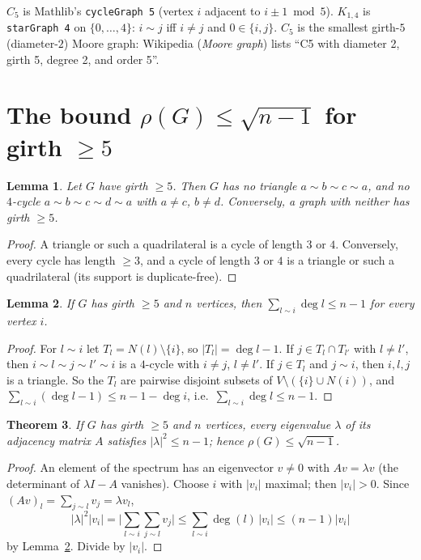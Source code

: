 \documentclass[11pt]{article}
\newtheorem{theorem}{Theorem}
\newtheorem{lemma}[theorem]{Lemma}
\theoremstyle{definition}
\theoremstyle{remark}
\renewcommand{\_}{\oldus\allowbreak}
\begin{document}
\noindent $C_5$ is Mathlib's \texttt{cycleGraph 5} (vertex $i$ adjacent to $i\pm1 \bmod 5$). $K_{1,4}$ is
\texttt{starGraph 4} on $\{0,\dots,4\}$: $i\sim j$ iff $i\ne j$ and $0\in\{i,j\}$. $C_5$ is the smallest
girth-$5$ (diameter-$2$) Moore graph: Wikipedia (\emph{Moore graph}) lists ``C5 with diameter 2, girth 5, degree 2, and order 5''.

\section{The bound $\rho(G)\le\sqrt{n-1}$ for girth $\ge5$}

\begin{lemma}\label{lem:girth}
Let $G$ have girth $\ge5$. Then $G$ has no triangle $a\sim b\sim c\sim a$, and no $4$-cycle
$a\sim b\sim c\sim d\sim a$ with $a\ne c$, $b\ne d$. Conversely, a graph with neither has girth $\ge5$.
\end{lemma}

\begin{proof}
A triangle or such a quadrilateral is a cycle of length $3$ or $4$. Conversely, every cycle has length
$\ge3$, and a cycle of length $3$ or $4$ is a triangle or such a quadrilateral (its support is duplicate-free).
\end{proof}

\begin{lemma}\label{lem:deg}
If $G$ has girth $\ge5$ and $n$ vertices, then $\sum_{l\sim i}\deg l\le n-1$ for every vertex $i$.
\end{lemma}

\begin{proof}
For $l\sim i$ let $T_l=N(l)\setminus\{i\}$, so $|T_l|=\deg l-1$. If $j\in T_l\cap T_{l'}$ with $l\ne l'$, then
$i\sim l\sim j\sim l'\sim i$ is a $4$-cycle with $i\ne j$, $l\ne l'$. If $j\in T_l$ and $j\sim i$, then
$i,l,j$ is a triangle. So the $T_l$ are pairwise disjoint subsets of $V\setminus(\{i\}\cup N(i))$, and
$\sum_{l\sim i}(\deg l-1)\le n-1-\deg i$, i.e.\ $\sum_{l\sim i}\deg l\le n-1$.
\end{proof}

\begin{theorem}\label{thm:bound}
If $G$ has girth $\ge5$ and $n$ vertices, every eigenvalue $\lambda$ of its adjacency matrix $A$ satisfies
$|\lambda|^2\le n-1$; hence $\rho(G)\le\sqrt{n-1}$.
\end{theorem}

\begin{proof}
An element of the spectrum has an eigenvector $v\ne0$ with $Av=\lambda v$ (the determinant of
$\lambda I-A$ vanishes). Choose $i$ with $|v_i|$ maximal; then $|v_i|>0$. Since
$(Av)_l=\sum_{j\sim l}v_j=\lambda v_l$,
\[
  |\lambda|^2|v_i| = \Big|\sum_{l\sim i}\sum_{j\sim l}v_j\Big| \le \sum_{l\sim i}\deg(l)\,|v_i|
  \le (n-1)|v_i|
\]
by Lemma~\ref{lem:deg}. Divide by $|v_i|$.
\end{proof}
\end{document}
